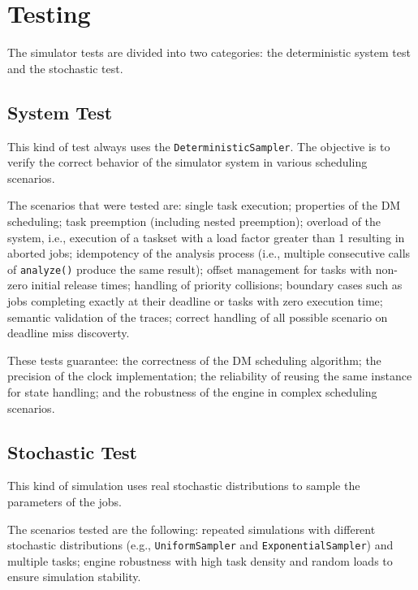 \section{Testing}
The simulator tests are divided into two categories: the deterministic system test and the stochastic test.

\subsection{System Test}
This kind of test always uses the \texttt{DeterministicSampler}. The objective is to verify the correct behavior of the simulator system in various scheduling scenarios.

The scenarios that were tested are: single task execution; properties of the DM scheduling; task preemption (including nested preemption); overload of the system, i.e., execution of a taskset with a load factor greater than 1 resulting in aborted jobs; idempotency of the analysis process (i.e., multiple consecutive calls of \texttt{analyze()} produce the same result); offset management for tasks with non-zero initial release times; handling of priority collisions; boundary cases such as jobs completing exactly at their deadline or tasks with zero execution time; semantic validation of the traces; correct handling of all possible scenario on deadline miss discoverty.

These tests guarantee: the correctness of the DM scheduling algorithm; the precision of the clock implementation; the reliability of reusing the same instance for state handling; and the robustness of the engine in complex scheduling scenarios.

\subsection{Stochastic Test}
This kind of simulation uses real stochastic distributions to sample the parameters of the jobs.

The scenarios tested are the following: repeated simulations with different stochastic distributions (e.g., \texttt{UniformSampler} and \texttt{ExponentialSampler}) and multiple tasks; engine robustness with high task density and random loads to ensure simulation stability.